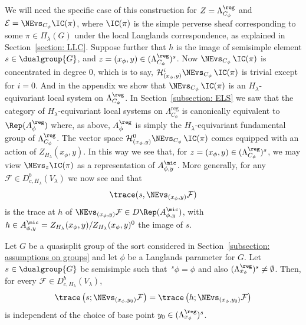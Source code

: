 \documentclass[11pt,letterpaper]{amsart}
\numberwithin{equation}{section}
\begin{document}
We will need the specific case of this construction for $Z = \Lambda_{C_\phi}^{\reg}$ and $\mathcal{E}=\NEvs_{C_\phi}\IC(\pi)$, where $\IC(\pi)$ is the simple perverse sheaf corresponding to some $\pi\in \Pi_{\lambda}(G)$ under the local Langlands correspondence, as explained in Section~\ref{section: LLC}.
Suppose further that $h$ is the image of semisimple element $s\in \dualgroup{G}$, and $z=(x_\phi,y)\in (\Lambda_{C_\phi}^{\reg})^s$.
Now $\NEvs_{C_\phi}\, \IC(\pi)$ is concentrated in degree $0$, which is to say, $\mathcal{H}^i_{(x_\phi,y)}\NEvs_{C_\phi}\, \IC(\pi)$ is trivial except for $i=0$.
And in the appendix we show that $\NEvs_{C_\phi}\, \IC(\pi)$ is an $H_\lambda$-equivariant local system on $\Lambda_{C_\phi}^{\reg}$.
In Section~\ref{subsection: ELS} we saw that the category of $H_\lambda$-equivariant local systems on $\Lambda_{C_\phi}^{\textrm{reg}}$ is canonically equivalent to $\Rep(A^\reg_{\phi})$ where, as above, $A^\reg_{\phi}$ is simply the $H_\lambda$-equivariant fundamental group of $\Lambda^\reg_{C_\phi}$.
The vector space $\mathcal{H}^0_{(x_\phi,y)}\NEvs_{C_\phi}\, \IC(\pi)$ comes equipped with an action of $Z_{H_\lambda}(x_\phi,y)$.  
In this way we see that, for $z=(x_\phi,y)\in (\Lambda^\reg_{C_\phi})^s$, we may view $\NEvs_z\IC(\pi)$ as a representation of $A^\mic_{\phi,y}$. 
More generally, for any $\mathcal{F}\in D^b_{c,H_\lambda}(V_\lambda)$ we now see and that
\[
\trace(s,\NEvs_{(x_\phi,y)}\mathcal{F})
\]
is the trace at $h$ of $\NEvs_{(x_\phi,y)}\mathcal{F} \in D \Rep(A^\mic_{\phi,y})$, with $h\in A^\mic_{\phi,y}=Z_{H_\lambda}(x_\phi,y)/Z_{H_\lambda}(x_\phi,y)^0$ the image of $s$.


\begin{proposition}
\label{proposition: independence of y}
Let $G$ be a quasisplit group of the sort considered in Section~\ref{subsection: assumptions on groups} and let $\phi$ be a Langlands parameter for $G$.
Let $s\in \dualgroup{G}$ be semisimple such that $\,^s\phi = \phi$ and also $(\Lambda^\reg_{x_\phi})^s\neq \emptyset$.
Then, for every $\mathcal{F}\in D^b_{c,H_\lambda}(V_\lambda)$,
\[
\trace\left({s}; \NEvs_{(x_\phi,y_0)} \mathcal{F} \right) 
= \trace\left({h}; \NEvs_{(x_\phi,y_0)} \mathcal{F} \right) 
\]
is independent of the choice of base point $y_0\in (\Lambda_{x_\phi}^\reg)^s$.
\end{proposition}
\end{document}
